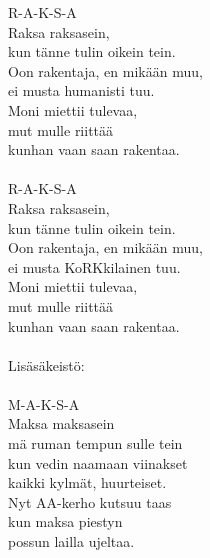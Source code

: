
            R-A-K-S-A \\
            Raksa raksasein, \\
            kun tänne tulin oikein tein. \\
            Oon rakentaja, en mikään muu, \\
            ei musta humanisti tuu. \\
            Moni miettii tulevaa, \\
            mut mulle riittää \\
            kunhan vaan saan rakentaa. \\
\hspace{10mm} \\
            R-A-K-S-A \\
            Raksa raksasein, \\
            kun tänne tulin oikein tein. \\
            Oon rakentaja, en mikään muu, \\
            ei musta KoRKkilainen tuu. \\
            Moni miettii tulevaa, \\
            mut mulle riittää \\
            kunhan vaan saan rakentaa. \\
\hspace{10mm} \\
            Lisäsäkeistö: \\
\hspace{10mm} \\
            M-A-K-S-A \\
            Maksa maksasein \\
            mä ruman tempun sulle tein \\
            kun vedin naamaan viinakset \\
            kaikki kylmät, huurteiset. \\
            Nyt AA-kerho kutsuu taas \\
            kun maksa piestyn \\
            possun lailla ujeltaa. \\
